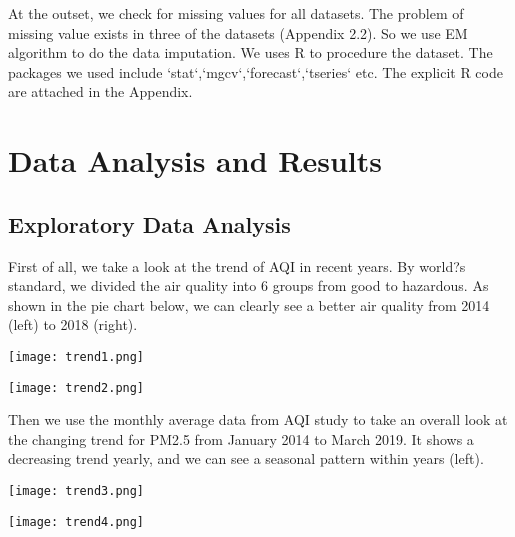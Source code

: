 \documentclass[11pt,]{article}
\begin{document}
At the outset, we check for missing values for all datasets. The problem of missing value exists in three of the datasets (Appendix 2.2). So we use EM algorithm to do the data imputation. We uses R to procedure the dataset. The packages we used include `stat`,`mgcv`,`forecast`,`tseries` etc. The explicit R code are attached in the Appendix. 


\section{Data Analysis and Results}

\subsection{Exploratory Data Analysis}

First of all, we take a look at the trend of AQI in recent years. By world?s standard, we divided the air quality into 6 groups from good to hazardous. As shown in the pie chart below, we can clearly see a better air quality from 2014 (left) to 2018 (right). 

\vspace{3mm}

\begin{minipage}{.45\linewidth}
\begin{flushleft}

{\texttt{[image: trend1.png]}}

\end{flushleft} 
\end{minipage}
\hfill
\begin{minipage}{.45\linewidth}
\begin{flushright} 

{\texttt{[image: trend2.png]}}

\end{flushright} 
\end{minipage}

\vspace{3mm}

Then we use the monthly average data from AQI study to take an overall look at the changing trend for PM2.5 from January 2014 to March 2019. It shows a decreasing trend yearly, and we can see a seasonal pattern within years (left).

\vspace{3mm}

\begin{minipage}{.45\linewidth}
\begin{flushleft}

{\texttt{[image: trend3.png]}}

\end{flushleft} 
\end{minipage}
\hfill
\begin{minipage}{.45\linewidth}
\begin{flushright} 

{\texttt{[image: trend4.png]}}

\end{flushright} 
\end{minipage}
\end{document}
